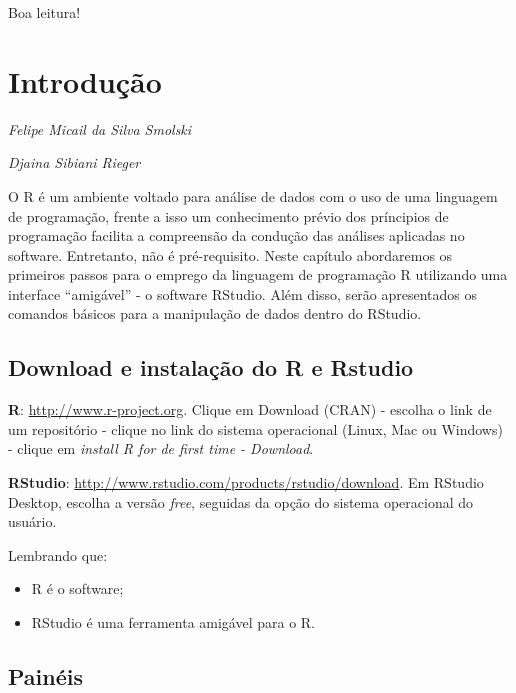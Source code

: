 \documentclass[12pt,brazil,oneside]{book}
\providecommand{\tightlist}{%
  \setlength{\itemsep}{0pt}\setlength{\parskip}{0pt}}
\begin{document}
Boa leitura!

\hypertarget{introducao}{%
\chapter{Introdução}\label{introducao}}

\begin{flushright}
\emph{Felipe Micail da Silva Smolski}

\emph{Djaina Sibiani Rieger}
\end{flushright}

O R é um ambiente voltado para análise de dados com o uso de uma
linguagem de programação, frente a isso um conhecimento prévio dos
príncipios de programação facilita a compreensão da condução das
análises aplicadas no software. Entretanto, não é pré-requisito. Neste
capítulo abordaremos os primeiros passos para o emprego da linguagem de
programação R utilizando uma interface ``amigável'' - o software
RStudio. Além disso, serão apresentados os comandos básicos para a
manipulação de dados dentro do RStudio.

\hypertarget{download-e-instalacao-do-r-e-rstudio}{%
\section{Download e instalação do R e
Rstudio}\label{download-e-instalacao-do-r-e-rstudio}}

\textbf{R}: \url{http://www.r-project.org}. Clique em Download (CRAN) -
escolha o link de um repositório - clique no link do sistema operacional
(Linux, Mac ou Windows) - clique em \emph{install R for de first time -
Download}.

\textbf{RStudio}:
\url{http://www.rstudio.com/products/rstudio/download}. Em RStudio
Desktop, escolha a versão \emph{free}, seguidas da opção do sistema
operacional do usuário.

Lembrando que:

\begin{itemize}
\tightlist
\item
  R é o software;
\item
  RStudio é uma ferramenta amigável para o R.
\end{itemize}

\hypertarget{paineis}{%
\section{Painéis}\label{paineis}}
\end{document}
